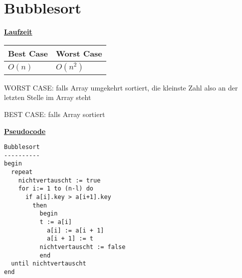 \documentclass[a4paper]{report}
\begin{document}
\chapter*{Bubblesort}

\underline{\bf{Laufzeit}}

\begin{tabular}{|l|l|}
\hline
Best Case & Worst Case \\ \hline
$O(n) $     & $O(n^2)$ \\ \hline
\end{tabular}

WORST CASE: falls Array umgekehrt sortiert, die kleinste Zahl also an der letzten Stelle im Array steht



BEST CASE: falls Array sortiert

\underline{\bf{Pseudocode}}

\begin{lstlisting}
Bubblesort
----------
begin 
  repeat
    nichtvertauscht := true 
    for i:= 1 to (n-l) do
      if a[i].key > a[i+1].key
      	then
      	  begin
      	  t := a[i]
            a[i] := a[i + 1]
            a[i + 1] := t
          nichtvertauscht := false
          end
  until nichtvertauscht
end
\end{lstlisting}
\end{document}
